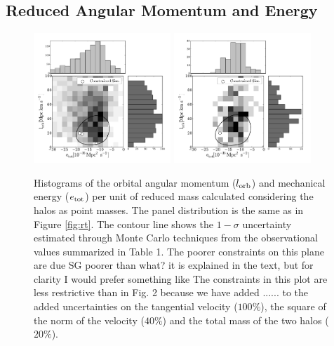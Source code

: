 \documentclass{emulateapj}
\begin{document}
\subsection{Reduced Angular Momentum and Energy}

\begin{figure}
\begin{center}
\includegraphics[keepaspectratio=true,width=0.46\textwidth]{./figures/test_EJ.pdf}
\includegraphics[keepaspectratio=true,width=0.46\textwidth]{./figures/test_EJ_narrow.pdf}
\caption{Histograms of the orbital angular momentum ($l_{\rm orb}$) and mechanical energy ($e_{\rm tot}$) per unit of reduced mass calculated considering the halos as point masses. The panel distribution is the same as in Figure \ref{fig:rt}. The contour line shows the $1-\sigma$ uncertainty estimated through Monte Carlo techniques from the observational values summarized in Table 1. The poorer constraints on this plane are due
SG  poorer than what? it is explained in the text, but for clarity I would prefer something like
The constraints in this plot are less restrictive than in Fig. 2 because we have added ......
 to the added uncertainties on the tangential velocity ($100\%$), the square of the norm of the velocity ($40\%$) and the total mass of the two halos ($20\%$). }
\label{fig:EJ}
\end{center}
\end{figure}
\end{document}
